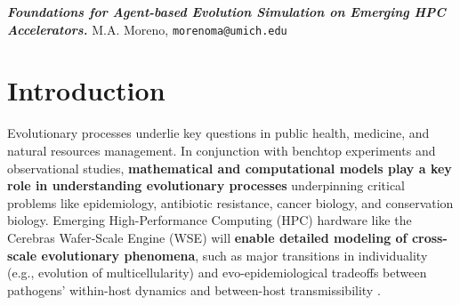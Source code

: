 

\noindent
\textit{\textbf{Foundations for Agent-based Evolution Simulation on Emerging HPC Accelerators.}}
\hfill
{\scriptsize M.A. Moreno, \texttt{morenoma@umich.edu}}

\section{Introduction}
Evolutionary processes underlie key questions in public health, medicine, and natural resources management.
In conjunction with benchtop experiments and observational studies, \textbf{mathematical and computational models play a key role in understanding evolutionary processes} underpinning critical problems like epidemiology, antibiotic resistance, cancer biology, and conservation biology.
Emerging High-Performance Computing (HPC) hardware like the Cerebras Wafer-Scale Engine (WSE) will \textbf{enable detailed modeling of cross-scale evolutionary phenomena}, such as major transitions in individuality (e.g., evolution of multicellularity) and evo-epidemiological tradeoffs between pathogens' within-host dynamics and between-host transmissibility \cite{goldsby2020major,schreiber2021evolutionary}.

